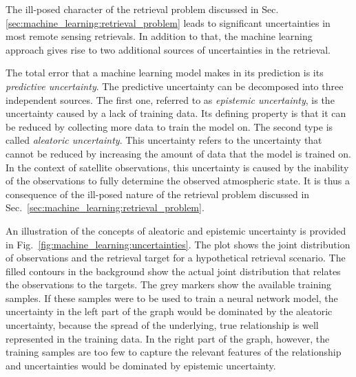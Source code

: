 The ill-posed character of the retrieval problem discussed in
Sec. \ref{sec:machine_learning:retrieval_problem} leads to significant
uncertainties in most remote sensing retrievals. In addition to that,
the machine learning approach gives rise to two additional sources
of uncertainties in the retrieval.


The total error that a machine learning model makes in its prediction is its
\textit{predictive uncertainty}. The predictive uncertainty can be decomposed
into three independent sources. The first one, referred to as \textit{epistemic
  uncertainty}, is the uncertainty caused by a lack of training data. Its
defining property is that it can be reduced by collecting more data to train the
model on. The second type is called \textit{aleatoric uncertainty}. This
uncertainty refers to the uncertainty that cannot be reduced by increasing the
amount of data that the model is trained on. In the context of satellite
observations, this uncertainty is caused by the inability of the observations to
fully determine the observed atmospheric state. It is thus a consequence of the
ill-posed nature of the retrieval problem  discussed in
Sec.~\ref{sec:machine_learning:retrieval_problem}.

An illustration of the concepts of aleatoric and epistemic uncertainty is provided
in Fig.~\ref{fig:machine_learning:uncertainties}. The plot shows the joint
distribution of observations and the retrieval target for a hypothetical retrieval
scenario. The filled contours in the background show the actual joint distribution
that relates the observations to the targets. The grey markers show the
available training samples. If these samples were to be used to train a neural
network model, the uncertainty in the left part of the graph would be dominated
by the aleatoric uncertainty, because the spread of the underlying, true relationship
is well represented in the training data. In the right part of the graph,
however, the training samples are too few to capture the relevant features of
the relationship and uncertainties would be dominated by epistemic uncertainty.

